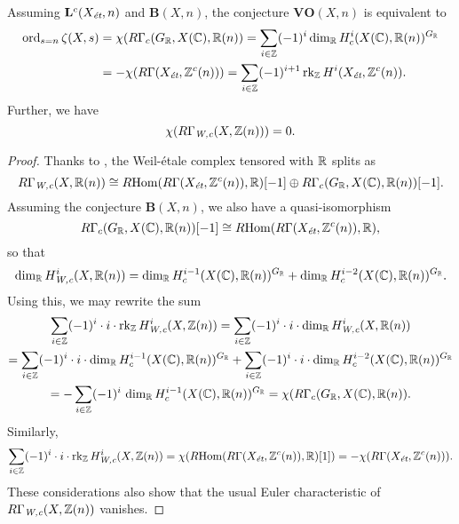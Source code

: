 \documentclass{article}
\numberwithin{equation}{section}
\begin{document}
\begin{proposition}
  \label{prop:VO(X,n)-assuming-B(X,n)}
  Assuming $\mathbf{L}^c (X_\et, n)$ and $\mathbf{B} (X,n)$, the conjecture
  $\mathbf{VO} (X,n)$ is equivalent to
  \begin{align*}
    \ord_{s=n} \zeta (X,s) & = \chi (R\Gamma_c (G_\RR, X(\CC), \RR (n))
    = \sum_{i \in \ZZ} (-1)^i \dim_\RR H^i_c (X(\CC), \RR (n))^{G_\RR} \\
                           & = -\chi (R\Gamma (X_\et, \ZZ^c (n)))
    = \sum_{i \in \ZZ} (-1)^{i+1} \rk_\ZZ H^i (X_\et, \ZZ^c (n)).
  \end{align*}
  Further, we have
  $$\chi (R\Gamma_\Wc (X, \ZZ(n))) = 0.$$

  \begin{proof}
    Thanks to \cite[Proposition~7.14]{Beshenov-Weil-etale-1}, the Weil-étale
    complex tensored with $\RR$ splits as
    \[ R\Gamma_\Wc (X,\RR (n)) \cong
      \RHom (R\Gamma (X_\et, \ZZ^c (n)), \RR) [-1] \oplus
      R\Gamma_c (G_\RR, X (\CC), \RR (n)) [-1]. \]
    Assuming the conjecture $\mathbf{B} (X,n)$, we also have a quasi-isomorphism
    \[ R\Gamma_c (G_\RR, X (\CC), \RR (n)) [-1] \cong
      \RHom (R\Gamma (X_\et, \ZZ^c (n)), \RR), \]
    so that
    \[ \dim_\RR H^i_\Wc (X,\RR(n)) =
      \dim_\RR H^{i-1}_c (X (\CC), \RR (n))^{G_\RR} +
      \dim_\RR H^{i-2}_c (X (\CC), \RR (n))^{G_\RR}. \]
    Using this, we may rewrite the sum
    \begin{multline*}
      \sum_{i \in \ZZ} (-1)^i \cdot i \cdot \rk_\ZZ H^i_\Wc (X, \ZZ (n)) =
      \sum_{i \in \ZZ} (-1)^i \cdot i \cdot \dim_\RR H^i_\Wc (X, \RR (n)) \\
      = \sum_{i \in \ZZ} (-1)^i \cdot i \cdot
      \dim_\RR H^{i-1}_c (X (\CC), \RR (n))^{G_\RR} +
      \sum_{i \in \ZZ} (-1)^i \cdot i \cdot
      \dim_\RR H^{i-2}_c (X (\CC), \RR (n))^{G_\RR} \\
      = -\sum_{i \in \ZZ} (-1)^i \, \dim_\RR H^{i-1}_c (X (\CC), \RR (n))^{G_\RR}
      = \chi (R\Gamma_c (G_\RR, X (\CC), \RR (n)).
    \end{multline*}
    Similarly,
    \[ \sum_{i \in \ZZ} (-1)^i \cdot i \cdot \rk_\ZZ H^i_\Wc (X, \ZZ (n)) =
      \chi (\RHom (R\Gamma (X_\et, \ZZ^c (n)), \RR) [1]) =
      -\chi (R\Gamma (X_\et, \ZZ^c (n))). \]
    These considerations also show that the usual Euler characteristic of
    $R\Gamma_\Wc (X, \ZZ(n))$ vanishes.
  \end{proof}
\end{proposition}
\end{document}
